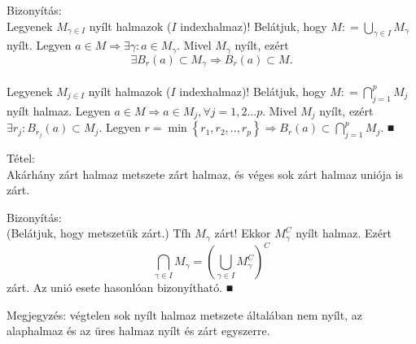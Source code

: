 \documentclass[12pt,a4paper]{scrartcl}
\newenvironment{tetel}{}{}
\newenvironment{bizonyitas}{}{}
\newenvironment{megjegyzes}{}{}
\begin{document}
\begin{bizonyitas}

Bizonyítás:\\
Legyenek \(M_{\gamma \in I}\) nyílt halmazok (\(I\) indexhalmaz)!
Belátjuk, hogy \(M: = {\bigcup\limits_{\gamma \in I}M_{\gamma}}\) nyílt.
Legyen
\(\left. a \in M\Rightarrow\exists\gamma:a \in M_{\gamma} \right.\).
Mivel \(M_{\gamma}\) nyílt, ezért
\[\left. \exists B_{r}\left( a \right) \subset M_{\gamma}\Rightarrow B_{r}\left( a \right) \subset M \right..\]\\
Legyenek \(M_{j \in I}\) nyílt halmazok (\(I\) indexhalmaz)! Belátjuk,
hogy \(M: = {\bigcap\limits_{j = 1}^{p}M_{j}}\) nyílt halmaz. Legyen
\(\left. a \in M\Rightarrow a \in M_{j},\forall j = 1,2...p \right.\).
Mivel \(M_{j}\) nyílt, ezért
\(\exists r_{j}:B_{r_{j}}\left( a \right) \subset M_{j}\). Legyen
\(\left. r = \min\left\{ {r_{1},r_{2},..,r_{p}} \right\}\Rightarrow B_{r}\left( a \right) \subset {\bigcap\limits_{j = 1}^{p}M_{j}} \right.\).
■

\end{bizonyitas}

\begin{tetel}

Tétel:\\
Akárhány zárt halmaz metszete zárt halmaz, és véges sok zárt halmaz
uniója is zárt.

\end{tetel}

\begin{bizonyitas}

Bizonyítás:\\
(Belátjuk, hogy metszetük zárt.) Tfh \(M_{\gamma}\) zárt! Ekkor
\(M_{\gamma}^{C}\) nyílt halmaz. Ezért
\[{\bigcap\limits_{\gamma \in I}M_{\gamma}} = \left( {\bigcup\limits_{\gamma \in I}M_{\gamma}^{C}} \right)^{C}\]
zárt. Az unió esete hasonlóan bizonyítható. ■

\end{bizonyitas}

\begin{megjegyzes}

Megjegyzés: végtelen sok nyílt halmaz metszete általában nem nyílt, az
alaphalmaz és az üres halmaz nyílt és zárt egyszerre.

\end{megjegyzes}
\end{document}
